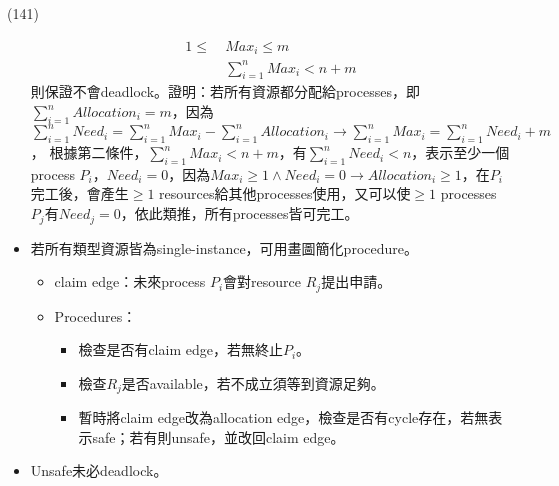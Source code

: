 \begin{theorem}{(141)}
\begin{itemize}
\begin{equation}
            \begin{aligned}
                1 \le \ & Max_i \le m \\
                & \sum_{i = 1}^{n} Max_i < n + m
            \end{aligned}
        \end{equation} 則保證不會deadlock。證明：若所有資源都分配給processes，即$\sum_{i = 1}^{n} Allocation_i = m$，因為$\sum_{i = 1}^{n} Need_i = \sum_{i = 1}^{n} Max_i - \sum_{i = 1}^{n} Allocation_i \rightarrow \sum_{i = 1}^{n} Max_i = \sum_{i = 1}^{n} Need_i + m$，
        根據第二條件，$\sum_{i = 1}^{n} Max_i < n + m$，有$\sum_{i = 1}^{n} Need_i < n$，表示至少一個process $P_i$，$Need_i = 0$，因為$Max_i \ge 1 \land Need_i = 0 \rightarrow Allocation_i \ge 1$，在$P_i$完工後，會產生$\ge 1$ resources給其他processes使用，又可以使$\ge 1$ processes $P_j$有$Need_j = 0$，依此類推，所有processes皆可完工。
        \item 若所有類型資源皆為single-instance，可用畫圖簡化procedure。\begin{itemize}
            \item claim edge：未來process $P_i$會對resource $R_j$提出申請。
            \item Procedures：\begin{itemize}
                \item 檢查是否有claim edge，若無終止$P_i$。
                \item 檢查$R_j$是否available，若不成立須等到資源足夠。
                \item 暫時將claim edge改為allocation edge，檢查是否有cycle存在，若無表示safe；若有則unsafe，並改回claim edge。
            \end{itemize}
        \end{itemize}
        \item Unsafe未必deadlock。
    \end{itemize}
\end{theorem}

